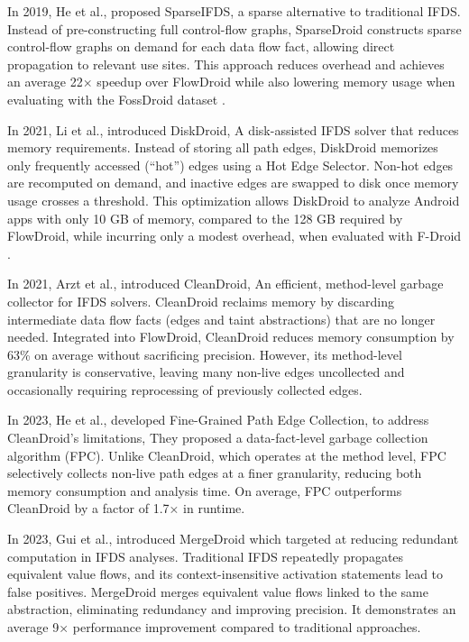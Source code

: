 In 2019, He et al., \cite{he2019performance} proposed SparseIFDS, a sparse alternative to traditional IFDS. 
Instead of pre-constructing full control-flow graphs, SparseDroid constructs sparse control-flow graphs on demand for each data flow fact, allowing direct propagation to relevant use sites. 
This approach reduces overhead and achieves an average 22× speedup over FlowDroid while also lowering memory usage when evaluating with the FossDroid dataset \cite{fossdroid}.

In 2021, Li et al., \cite{li2021scaling} introduced DiskDroid, A disk-assisted IFDS solver that reduces memory requirements. 
Instead of storing all path edges, DiskDroid memorizes only frequently accessed (“hot”) edges using a Hot Edge Selector. 
Non-hot edges are recomputed on demand, and inactive edges are swapped to disk once memory usage crosses a threshold. 
This optimization allows DiskDroid to analyze Android apps with only 10 GB of memory, compared to the 128 GB required by FlowDroid, while incurring only a modest overhead, when evaluated with F-Droid \cite{fossdroid}.

In 2021, Arzt et al., \cite{arzt2021sustainable} introduced CleanDroid, An efficient, method-level garbage collector for IFDS solvers. 
CleanDroid reclaims memory by discarding intermediate data flow facts (edges and taint abstractions) that are no longer needed. 
Integrated into FlowDroid, CleanDroid reduces memory consumption by 63\% on average without sacrificing precision. 
However, its method-level granularity is conservative, leaving many non-live edges uncollected and occasionally requiring reprocessing of previously collected edges.

In 2023, He et al., \cite{he2023reducing} developed Fine-Grained Path Edge Collection, to address CleanDroid’s limitations, They proposed a data-fact-level garbage collection algorithm (FPC). 
Unlike CleanDroid, which operates at the method level, FPC selectively collects non-live path edges at a finer granularity, reducing both memory consumption and analysis time. On average, FPC outperforms CleanDroid by a factor of 1.7× in runtime.

In 2023, Gui et al., \cite{gui2023merge} introduced MergeDroid which targeted at reducing redundant computation in IFDS analyses. 
Traditional IFDS repeatedly propagates equivalent value flows, and its context-insensitive activation statements lead to false positives. 
MergeDroid merges equivalent value flows linked to the same abstraction, eliminating redundancy and improving precision. It demonstrates an average 9× performance improvement compared to traditional approaches.

